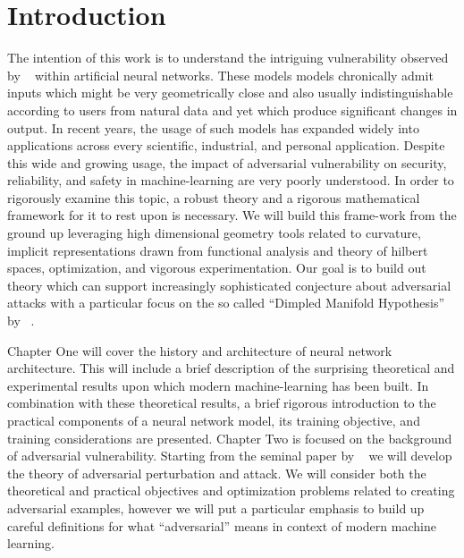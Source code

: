 \chapter{Introduction} %
\label{Chapter1} %

The intention of this work is to understand the intriguing vulnerability
observed by ~\citet{szegedy2013} within artificial neural
networks. These models models chronically admit inputs which might be
very geometrically close and also usually indistinguishable according
to users from natural data and yet which produce significant changes
in output. In recent years, the usage of such models has expanded
widely into applications across every scientific, industrial, and
personal application. Despite this wide and growing usage,
the impact of adversarial vulnerability on security, reliability, and
safety in machine-learning are very poorly understood. In order to
rigorously examine this topic, a robust theory and a rigorous
mathematical framework for it to rest upon is necessary. We will build
this frame-work from the ground up leveraging high dimensional
geometry tools related to curvature, implicit representations drawn
from functional analysis and theory of hilbert spaces, optimization,
and vigorous experimentation. Our goal is to build out theory which
can support increasingly sophisticated conjecture about adversarial
attacks with a particular focus on the so called ``Dimpled Manifold
Hypothesis'' by ~\citet{shamir2021dimpled}.

Chapter One will cover the history and architecture of neural network
architecture. This will include a brief description of the surprising
theoretical and experimental results upon which modern
machine-learning has been built. In combination with these theoretical
results, a brief rigorous introduction to the practical components of
a neural network model, its training objective, and training
considerations are presented. Chapter Two is focused on the background
of adversarial vulnerability. Starting from the seminal paper by
~\citet{szegedy2013} we will develop the theory of adversarial
perturbation and attack. We will consider both the theoretical and
practical objectives and optimization problems related to creating
adversarial examples, however we will put a particular emphasis to
build up careful definitions for what ``adversarial'' means in context
of modern machine learning.

